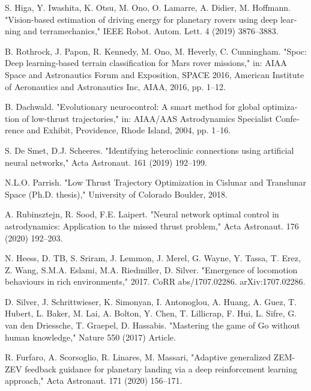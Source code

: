 \documentclass[a4paper]{article}
\begin{document}
\begin{latin}
\begin{thebibliography}{1}
		S. Higa, Y. Iwashita, K. Otsu, M. Ono, O. Lamarre, A. Didier, M. Hoffmann.
		"Vision-based estimation of driving energy for planetary rovers using deep learning and terramechanics,"
		IEEE Robot. Autom. Lett. 4 (2019) 3876–3883.
		
		B. Rothrock, J. Papon, R. Kennedy, M. Ono, M. Heverly, C. Cunningham.
		"Spoc: Deep learning-based terrain classification for Mars rover missions,"
		in: AIAA Space and Astronautics Forum and Exposition, SPACE 2016,
		American Institute of Aeronautics and Astronautics Inc, AIAA, 2016, pp. 1–12.
		
		B. Dachwald.
		"Evolutionary neurocontrol: A smart method for global optimization of low-thrust trajectories,"
		in: AIAA/AAS Astrodynamics Specialist Conference and Exhibit,
		Providence, Rhode Island, 2004, pp. 1–16.
		
		S. De Smet, D.J. Scheeres.
		"Identifying heteroclinic connections using artificial neural networks,"
		Acta Astronaut. 161 (2019) 192–199.
		
		N.L.O. Parrish.
		"Low Thrust Trajectory Optimization in Cislunar and Translunar Space (Ph.D. thesis),"
		University of Colorado Boulder, 2018.
		
		A. Rubinsztejn, R. Sood, F.E. Laipert.
		"Neural network optimal control in astrodynamics: Application to the missed thrust problem,"
		Acta Astronaut. 176 (2020) 192–203.
		
		N. Heess, D. TB, S. Sriram, J. Lemmon, J. Merel, G. Wayne, Y. Tassa, T. Erez, Z. Wang, S.M.A. Eslami, M.A. Riedmiller, D. Silver.
		"Emergence of locomotion behaviours in rich environments," 2017.
		CoRR abs/1707.02286.
		arXiv:1707.02286.
		
		D. Silver, J. Schrittwieser, K. Simonyan, I. Antonoglou, A. Huang, A. Guez, T. Hubert, L. Baker, M. Lai, A. Bolton, Y. Chen, T. Lillicrap, F. Hui, L. Sifre, G. van den Driessche, T. Graepel, D. Hassabis.
		"Mastering the game of Go without human knowledge," Nature 550 (2017) Article.
		
		R. Furfaro, A. Scorsoglio, R. Linares, M. Massari,
		"Adaptive generalized ZEM-ZEV feedback guidance for planetary landing via a deep reinforcement learning approach,"
		Acta Astronaut. 171 (2020) 156–171.
		

\end{thebibliography}
\end{latin}
\end{document}
